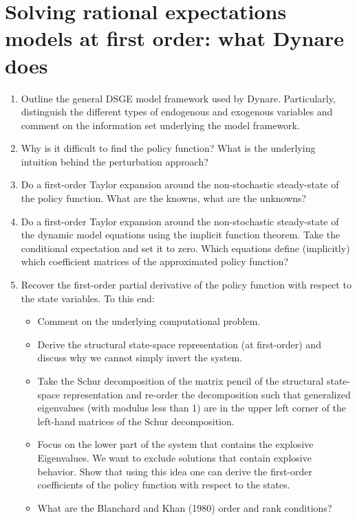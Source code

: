 \section[Solving rational expectations models at first order: what Dynare does]{Solving rational expectations models at first order: what Dynare does\label{ex:PerturbationDynareFirstOrder}}
\begin{enumerate}
 	\item Outline the general DSGE model framework used by Dynare. Particularly, distinguish the different types of endogenous and exogenous variables and comment on the information set underlying the model framework.
 	\item Why is it difficult to find the policy function? What is the underlying intuition behind the perturbation approach?
 	\item Do a first-order Taylor expansion around the non-stochastic steady-state of the policy function. What are the knowns, what are the unknowns?
 	\item Do a first-order Taylor expansion around the non-stochastic steady-state of the dynamic model equations using the implicit function theorem. Take the conditional expectation and set it to zero. Which equations define (implicitly) which coefficient matrices of the approximated policy function?
 	\item Recover the first-order partial derivative of the policy function with respect to the state variables. To this end:
	 \begin{itemize}
		 \item Comment on the underlying computational problem.
		 \item Derive the structural state-space representation (at first-order) and discuss why we cannot simply invert the system. 
		 \item Take the Schur decomposition of the matrix pencil of the structural state-space representation and re-order the decomposition such that generalized eigenvalues (with modulus less than 1) are in the upper left corner of the left-hand matrices of the Schur decomposition.
		 \item Focus on the lower part of the system that contains the explosive Eigenvalues. We want to exclude solutions that contain explosive behavior. Show that using this idea one can derive the first-order coefficients of the policy function with respect to the states.
		 \item What are the Blanchard and Khan (1980) order and rank conditions?
	 \end{itemize} 

\end{enumerate}
